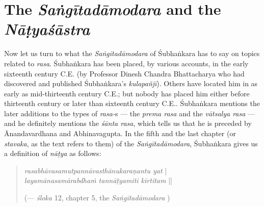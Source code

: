 \section*{The \textsl{Saṅgītadāmodara} and the \textsl{Nāṭyaśāstra}}

Now let us turn to what the \textsl{Saṅgītadāmodara} of Śubhaṅkara has to say on topics related to \textsl{rasa}. Śubhaṅkara has been placed, by various accounts, in the early sixteenth century C.E. (by Professor Dinesh Chandra Bhattacharya who had discovered and published Śubhaṅkara’s \textsl{kulapañjī}). Others have located him in as early as mid-thirteenth century C.E.; but nobody has placed him either before thirteenth century or later than sixteenth century C.E.. Śubhaṅkara mentions the later additions to the types of \textsl{rasa-}s --- the \textsl{prema rasa} and the \textsl{vātsalya rasa} --- and he definitely mentions the \textsl{śānta rasa}, which tells us that he is preceded by Ānandavardhana and Abhinavagupta. In the fifth and the last chapter (or \textsl{stavaka}, as the text refers to them) of the \textsl{Saṅgītadāmodara}, Śubhaṅkara gives us a definition of \textsl{nāṭya} as follows:

\newpage

\begin{quote}
\textsl{rasabhāvasamutpannāvasthānukaraṇantu yat} |\\
\textsl{layamānasamārabdhaṁ tannāṭyamiti kīrtitam} || 

\hfill (--- \textsl{śloka} 12, chapter 5, the \textsl{Saṅgītadāmodara}  ) 
\end{quote}

